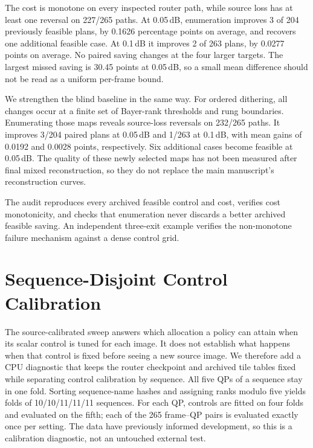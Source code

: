 The cost is monotone on every inspected router path, while source loss has
at least one reversal on 227/265 paths. At 0.05\,dB, enumeration improves
3 of 204 previously feasible plans, by 0.1626 percentage points on average,
and recovers one additional feasible case. At 0.1\,dB it improves 2 of 263
plans, by 0.0277 points on average. No paired saving changes at the four
larger targets. The largest missed saving is 30.45 points at 0.05\,dB, so a
small mean difference should not be read as a uniform per-frame bound.

We strengthen the blind baseline in the same way. For ordered dithering,
all changes occur at a finite set of Bayer-rank thresholds and rung
boundaries. Enumerating those maps reveals source-loss reversals on 232/265
paths. It improves 3/204 paired plans at 0.05\,dB and 1/263 at 0.1\,dB,
with mean gains of 0.0192 and 0.0028 points, respectively. Six additional
cases become feasible at 0.05\,dB. The quality of these newly selected maps
has not been measured after final mixed reconstruction, so they do not
replace the main manuscript's reconstruction curves.

The audit reproduces every archived feasible control and cost, verifies
cost monotonicity, and checks that enumeration never discards a better
archived feasible saving. An independent three-exit example verifies the
non-monotone failure mechanism against a dense control grid.

\section{Sequence-Disjoint Control Calibration}
\label{sec:crossfit}

The source-calibrated sweep answers which allocation a policy can attain
when its scalar control is tuned for each image. It does not establish what
happens when that control is fixed before seeing a new source image.
We therefore add a CPU diagnostic that keeps the router checkpoint and
archived tile tables fixed while separating control calibration by sequence.
All five QPs of a sequence stay in one fold. Sorting sequence-name hashes
and assigning ranks modulo five yields folds of 10/10/11/11/11 sequences.
For each QP, controls are fitted on four folds and evaluated on the fifth;
each of the 265 frame--QP pairs is evaluated exactly once per setting.
The data have previously informed development, so this is a calibration
diagnostic, not an untouched external test.

